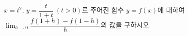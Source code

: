 $x=t^2$, $y=\dfrac{t}{1+t}\ (t>0)$로 주어진 함수 $y=f(x)$에 대하여 $\displaystyle\lim_{h\to 0}\dfrac{f(1+h)-f(1-h)}{h}$의 값을 구하시오.
